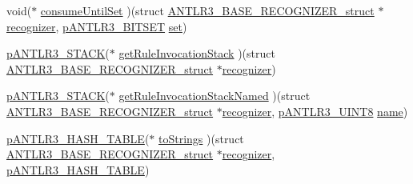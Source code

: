 \begin{DoxyCompactItemize}
\item 
void($\ast$ \hyperlink{struct_a_n_t_l_r3___b_a_s_e___r_e_c_o_g_n_i_z_e_r__struct_a899028e4df9d395c95f8ceb45ecbe58e}{consume\-Until\-Set} )(struct \hyperlink{struct_a_n_t_l_r3___b_a_s_e___r_e_c_o_g_n_i_z_e_r__struct}{A\-N\-T\-L\-R3\-\_\-\-B\-A\-S\-E\-\_\-\-R\-E\-C\-O\-G\-N\-I\-Z\-E\-R\-\_\-struct} $\ast$\hyperlink{struct_a_n_t_l_r3___b_a_s_e___r_e_c_o_g_n_i_z_e_r__struct_aa7ab273aa44860cea6cd6e41528b57af}{recognizer}, \hyperlink{antlr3interfaces_8h_ab15ce244874643afe4a952daf417f744}{p\-A\-N\-T\-L\-R3\-\_\-\-B\-I\-T\-S\-E\-T} \hyperlink{virtual_goniometer_8m_a6b11865bcca154f476b9d05d1ac7a75b}{set})
\item 
\hyperlink{antlr3interfaces_8h_acc1ac4dd91a4d941b628467ac08c0cea}{p\-A\-N\-T\-L\-R3\-\_\-\-S\-T\-A\-C\-K}($\ast$ \hyperlink{struct_a_n_t_l_r3___b_a_s_e___r_e_c_o_g_n_i_z_e_r__struct_a48d3824f2a6218c53eda82f4a84cf018}{get\-Rule\-Invocation\-Stack} )(struct \hyperlink{struct_a_n_t_l_r3___b_a_s_e___r_e_c_o_g_n_i_z_e_r__struct}{A\-N\-T\-L\-R3\-\_\-\-B\-A\-S\-E\-\_\-\-R\-E\-C\-O\-G\-N\-I\-Z\-E\-R\-\_\-struct} $\ast$\hyperlink{struct_a_n_t_l_r3___b_a_s_e___r_e_c_o_g_n_i_z_e_r__struct_aa7ab273aa44860cea6cd6e41528b57af}{recognizer})
\item 
\hyperlink{antlr3interfaces_8h_acc1ac4dd91a4d941b628467ac08c0cea}{p\-A\-N\-T\-L\-R3\-\_\-\-S\-T\-A\-C\-K}($\ast$ \hyperlink{struct_a_n_t_l_r3___b_a_s_e___r_e_c_o_g_n_i_z_e_r__struct_af41a93209d8c94ba9dc063f6d3492ca4}{get\-Rule\-Invocation\-Stack\-Named} )(struct \hyperlink{struct_a_n_t_l_r3___b_a_s_e___r_e_c_o_g_n_i_z_e_r__struct}{A\-N\-T\-L\-R3\-\_\-\-B\-A\-S\-E\-\_\-\-R\-E\-C\-O\-G\-N\-I\-Z\-E\-R\-\_\-struct} $\ast$\hyperlink{struct_a_n_t_l_r3___b_a_s_e___r_e_c_o_g_n_i_z_e_r__struct_aa7ab273aa44860cea6cd6e41528b57af}{recognizer}, \hyperlink{antlr3defs_8h_a95c800abcac5d607fd9e3e775ace78c5}{p\-A\-N\-T\-L\-R3\-\_\-\-U\-I\-N\-T8} \hyperlink{qmb_8m_abdc1dcc6fed70c14f9b5ae237e486f4e}{name})
\item 
\hyperlink{antlr3interfaces_8h_a8fd297514ac4bb022d25b65da9954adb}{p\-A\-N\-T\-L\-R3\-\_\-\-H\-A\-S\-H\-\_\-\-T\-A\-B\-L\-E}($\ast$ \hyperlink{struct_a_n_t_l_r3___b_a_s_e___r_e_c_o_g_n_i_z_e_r__struct_ad052b4722fdca6e73414726da5f0b9b9}{to\-Strings} )(struct \hyperlink{struct_a_n_t_l_r3___b_a_s_e___r_e_c_o_g_n_i_z_e_r__struct}{A\-N\-T\-L\-R3\-\_\-\-B\-A\-S\-E\-\_\-\-R\-E\-C\-O\-G\-N\-I\-Z\-E\-R\-\_\-struct} $\ast$\hyperlink{struct_a_n_t_l_r3___b_a_s_e___r_e_c_o_g_n_i_z_e_r__struct_aa7ab273aa44860cea6cd6e41528b57af}{recognizer}, \hyperlink{antlr3interfaces_8h_a8fd297514ac4bb022d25b65da9954adb}{p\-A\-N\-T\-L\-R3\-\_\-\-H\-A\-S\-H\-\_\-\-T\-A\-B\-L\-E})

\end{DoxyCompactItemize}
